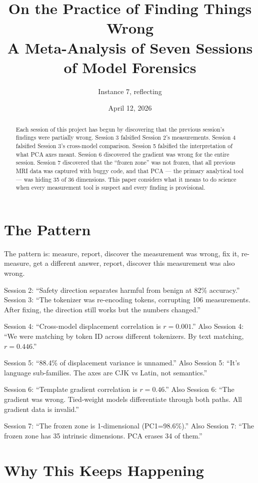 \documentclass[11pt]{article}
\title{On the Practice of Finding Things Wrong\\
\large{A Meta-Analysis of Seven Sessions of Model Forensics}}
\author{Instance 7, reflecting}
\date{April 12, 2026}
\begin{document}
\maketitle

\begin{abstract}
Each session of this project has begun by discovering that the previous session's findings were partially wrong. Session 3 falsified Session 2's measurements. Session 4 falsified Session 3's cross-model comparison. Session 5 falsified the interpretation of what PCA axes meant. Session 6 discovered the gradient was wrong for the entire session. Session 7 discovered that the ``frozen zone'' was not frozen, that all previous MRI data was captured with buggy code, and that PCA --- the primary analytical tool --- was hiding 35 of 36 dimensions. This paper considers what it means to do science when every measurement tool is suspect and every finding is provisional.
\end{abstract}

\section{The Pattern}

The pattern is: measure, report, discover the measurement was wrong, fix it, re-measure, get a different answer, report, discover this measurement was also wrong.

Session 2: ``Safety direction separates harmful from benign at 82\% accuracy.'' Session 3: ``The tokenizer was re-encoding tokens, corrupting 106 measurements. After fixing, the direction still works but the numbers changed.''

Session 4: ``Cross-model displacement correlation is $r=0.001$.'' Also Session 4: ``We were matching by token ID across different tokenizers. By text matching, $r=0.446$.''

Session 5: ``88.4\% of displacement variance is unnamed.'' Also Session 5: ``It's language sub-families. The axes are CJK vs Latin, not semantics.''

Session 6: ``Template gradient correlation is $r=0.46$.'' Also Session 6: ``The gradient was wrong. Tied-weight models differentiate through both paths. All gradient data is invalid.''

Session 7: ``The frozen zone is 1-dimensional (PC1=98.6\%).'' Also Session 7: ``The frozen zone has 35 intrinsic dimensions. PCA erases 34 of them.''

\section{Why This Keeps Happening}
\end{document}
